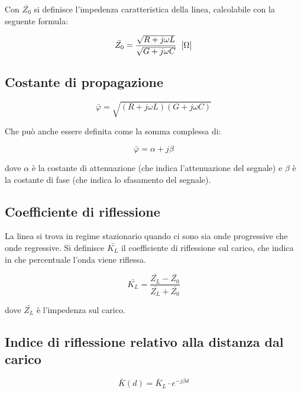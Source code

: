 \documentclass{article}
\begin{document}
    Con $\bar{Z_0}$ si definisce l'impedenza caratteristica della linea, calcolabile con la seguente formula:

    \begin{equation}
        \bar{Z_0} = \frac{\sqrt{R + j \omega L}}{\sqrt{G + j \omega C}} \hspace{0.2cm} [\Omega]
    \end{equation}

    \subsection{Costante di propagazione}

    \begin{equation}
        \bar{\varphi} = \sqrt{(R + j \omega L)(G + j \omega C)}
    \end{equation}

    Che può anche essere definita come la somma complessa di:

    \begin{equation}
        \bar{\varphi} = \alpha + j \beta
    \end{equation}

    dove $\alpha$ è la costante di attenuazione (che indica l'attenuazione del segnale) e $\beta$ è la 
    costante di fase (che indica lo sfasamento del segnale).

    \subsection{Coefficiente di riflessione}

    La linea si trova in regime stazionario quando ci sono sia onde progressive che onde regressive.
    Si definisce $\bar{K_L}$ il coefficiente di riflessione sul carico, che indica in che percentuale l'onda viene
    riflessa.

    \begin{equation}
        \bar{K_L} = \frac{
            \bar{Z_L} - \bar{Z_0}
        }{
            \bar{Z_L} + \bar{Z_0}
        }
    \end{equation}

    dove $\bar{Z_L}$ è l'impedenza sul carico.

    \subsection{Indice di riflessione relativo alla distanza dal carico}

    \begin{equation}
    \bar{K}(d) = \bar{K}_L \cdot e^{-j \beta d}
    \end{equation}
\end{document}

